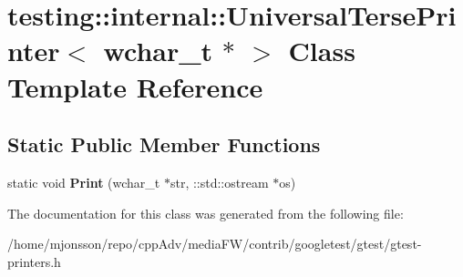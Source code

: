 \hypertarget{classtesting_1_1internal_1_1UniversalTersePrinter_3_01wchar__t_01_5_01_4}{}\section{testing\+:\+:internal\+:\+:Universal\+Terse\+Printer$<$ wchar\+\_\+t $\ast$ $>$ Class Template Reference}
\label{classtesting_1_1internal_1_1UniversalTersePrinter_3_01wchar__t_01_5_01_4}
\subsection*{Static Public Member Functions}
\begin{DoxyCompactItemize}
\item 
\mbox{\label{classtesting_1_1internal_1_1UniversalTersePrinter_3_01wchar__t_01_5_01_4_a9cdf673b44d19e6879253f30f11cd740}} 
static void {\bfseries Print} (wchar\+\_\+t $\ast$str, \+::std\+::ostream $\ast$os)
\end{DoxyCompactItemize}


The documentation for this class was generated from the following file\+:\begin{DoxyCompactItemize}
\item 
/home/mjonsson/repo/cpp\+Adv/media\+F\+W/contrib/googletest/gtest/gtest-\/printers.\+h\end{DoxyCompactItemize}
